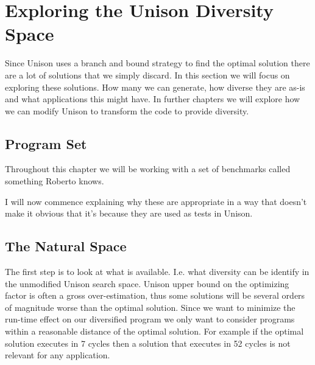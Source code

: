 \chapter{Exploring the Unison Diversity Space}

Since Unison uses a branch and bound strategy to find the optimal solution there are a lot
of solutions that we simply discard. In this section we will focus on exploring these
solutions. How many we can generate, how diverse they are as-is and what applications this
might have. In further chapters we will explore how we can modify Unison to transform the code to
provide diversity.

%
%


\section{Program Set}

Throughout this chapter we will be working with a set of benchmarks called something
Roberto knows.

I will now commence explaining why these are appropriate in a way that doesn't make it
obvious that it's because they are used as tests in Unison.

\section{The Natural Space}

The first step is to look at what is available. I.e. what diversity can be identify in the
unmodified Unison search space. Unison upper bound on the optimizing factor is often a
gross over-estimation, thus some solutions will be several orders of magnitude worse than
the optimal solution. Since we want to minimize the run-time effect on our diversified
program we only want to consider programs within a reasonable distance of the optimal
solution. For example if the optimal solution executes in 7 cycles then a solution that
executes in 52 cycles is not relevant for any application.

